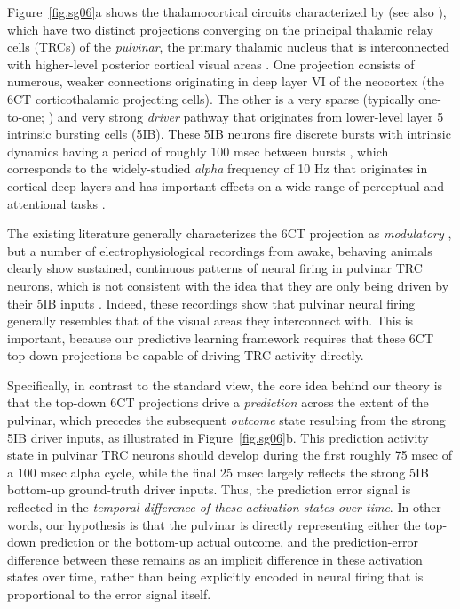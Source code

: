 \documentclass[11pt,twoside]{article}
\newif\myifpdf
\begin{document}
Figure~\ref{fig.sg06}a shows the thalamocortical circuits characterized by  (see also ), which have two distinct projections converging on the principal thalamic relay cells (TRCs) of the \emph{pulvinar}, the primary thalamic nucleus that is interconnected with higher-level posterior cortical visual areas \cite{Shipp03,ArcaroPinskKastner15}.  One projection consists of numerous, weaker connections originating in deep layer VI of the neocortex (the 6CT corticothalamic projecting cells).  The other is a very sparse (typically one-to-one; ) and very strong \emph{driver} pathway that originates from lower-level layer 5 intrinsic bursting cells (5IB).  These 5IB neurons fire discrete bursts with intrinsic dynamics having a period of roughly 100 msec between bursts \cite{LarkumZhuSakmann99,FranceschettiGuatteoPanzicaEtAl95,LorinczKekesiJuhaszEtAl09,SaalmannPinskWangEtAl12}, which corresponds to the widely-studied \emph{alpha} frequency of 10 Hz that originates in cortical deep layers and has important effects on a wide range of perceptual and attentional tasks \cite{BuffaloFriesLandmanEtAl11,VanRullenKoch03,JensenBonnefondVanRullen12,FiebelkornKastner19}.

The existing literature generally characterizes the 6CT projection as \emph{modulatory} \cite{ShermanGuillery13,UsreySherman18}, but a number of electrophysiological recordings from awake, behaving animals clearly show sustained, continuous patterns of neural firing in pulvinar TRC neurons, which is not consistent with the idea that they are only being driven by their 5IB inputs \cite{Bender82,PetersenRobinsonKeys85,BenderYouakim01,Robinson93,SaalmannPinskWangEtAl12,KomuraNikkuniHirashimaEtAl13,ZhouSchaferDesimone16}.  Indeed, these recordings show that pulvinar neural firing generally resembles that of the visual areas they interconnect with.  This is important, because our predictive learning framework requires that these 6CT top-down projections be capable of driving TRC activity directly.

Specifically, in contrast to the standard view, the core idea behind our theory is that the top-down 6CT projections drive a \emph{prediction} across the extent of the pulvinar, which precedes the subsequent \emph{outcome} state resulting from the strong 5IB driver inputs, as illustrated in Figure~\ref{fig.sg06}b.  This prediction activity state in pulvinar TRC neurons should develop during the first roughly 75 msec of a 100 msec alpha cycle, while the final 25 msec largely reflects the strong 5IB bottom-up ground-truth driver inputs.  Thus, the prediction error signal is reflected in the \emph{temporal difference of these activation states over time}.  In other words, our hypothesis is that the pulvinar is directly representing either the top-down prediction or the bottom-up actual outcome, and the prediction-error difference between these remains as an implicit difference in these activation states over time, rather than being explicitly encoded in neural firing that is proportional to the error signal itself.
\end{document}

